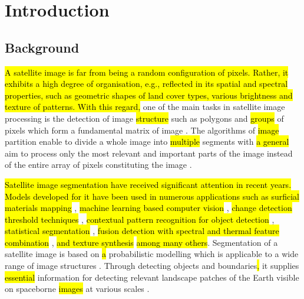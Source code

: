 \documentclass[sustainability,article,submit,pdftex,moreauthors]{Definitions/mdpi}
\begin{document}
\section{Introduction}

\subsection{Background} 

\hl{A satellite image is far from being a random configuration of pixels. Rather, it exhibits a high degree of organisation, e.g., reflected in its spatial and spectral properties, such as geometric shapes of land cover types, various brightness and texture of patterns. With this regard, }one of the main tasks in satellite image processing is the detection of image \hl{structure }such as polygons and \hl{groups} of pixels which form a fundamental matrix of image \cite{Solomon}. The algorithms of \hl{image }partition enable to divide a whole image into \hl{multiple }segments with \hl{a general }aim to process only the most relevant and important parts of the image instead of\hl{ }the entire array of pixels constituting the image \cite{LI202326,DONG2022109695,WANG2023110415}. 

\hl{Satellite image segmentation have received significant attention in recent years. Models developed for it have been used in numerous applications such as surficial materials mapping} \cite{6947039}, \hl{machine learning based computer vision} \cite{8914551}, \hl{change detection threshold techniques} \cite{6005084}, \hl{contextual pattern recognition for object detection} \cite{10006917,9719051,4284070}, \hl{statistical segmentation} \cite{7730056,7877513}, \hl{fusion detection with spectral and thermal feature combination} \cite{7730710}, \hl{and texture synthesis} \cite{576322} \hl{among many others}.
Segmentation of a satellite image is based on \hl{a} probabilistic modelling which\hl{ }is applicable to a wide range of image structures \cite{Buscombe}. Through detecting objects and boundaries\hl{, }it supplies \hl{essential} information for detecting relevant landscape patches of the Earth visible on\hl{ }spaceborne\hl{ images }at various scales \cite{Tzotsos}. 
\end{document}
